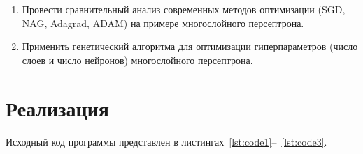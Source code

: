 \documentclass[a4paper, 14pt]{extarticle}
\begin{document}
\begin{enumerate}
    \item Провести сравнительный анализ современных методов
оптимизации (SGD, NAG, Adagrad, ADAM) на примере
многослойного персептрона.
    \item Применить генетический алгоритма для
оптимизации гиперпараметров (число слоев и число
нейронов) многослойного персептрона.
\end{enumerate}

\section{Реализация}\label{Sect::realize}

Исходный код программы представлен в листингах~\ref{lst:code1}--~\ref{lst:code3}.
\end{document}
